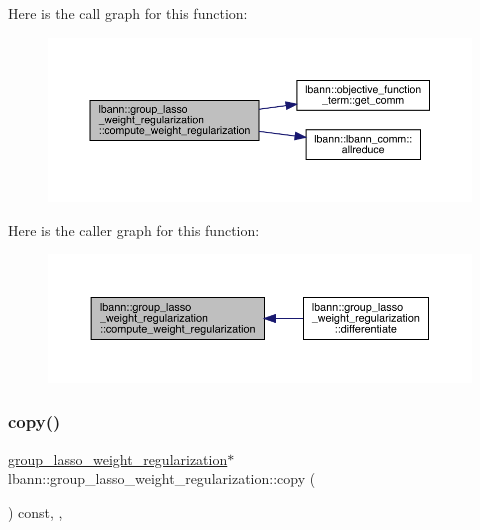Here is the call graph for this function\+:\nopagebreak
\begin{figure}[H]
\begin{center}
\leavevmode
\includegraphics[width=350pt]{classlbann_1_1group__lasso__weight__regularization_a9d721928716349c8327ca67257fb827a_cgraph}
\end{center}
\end{figure}
Here is the caller graph for this function\+:\nopagebreak
\begin{figure}[H]
\begin{center}
\leavevmode
\includegraphics[width=350pt]{classlbann_1_1group__lasso__weight__regularization_a9d721928716349c8327ca67257fb827a_icgraph}
\end{center}
\end{figure}
\mbox{\label{classlbann_1_1group__lasso__weight__regularization_a279b67ef561918425e78cb9b2fa9bb88}} 
\subsubsection{\texorpdfstring{copy()}{copy()}}
{\footnotesize\ttfamily \hyperlink{classlbann_1_1group__lasso__weight__regularization}{group\+\_\+lasso\+\_\+weight\+\_\+regularization}$\ast$ lbann\+::group\+\_\+lasso\+\_\+weight\+\_\+regularization\+::copy (\begin{DoxyParamCaption}{ }\end{DoxyParamCaption}) const\hspace{0.3cm}{\ttfamily [inline]}, {\ttfamily [override]}, {\ttfamily [virtual]}}

